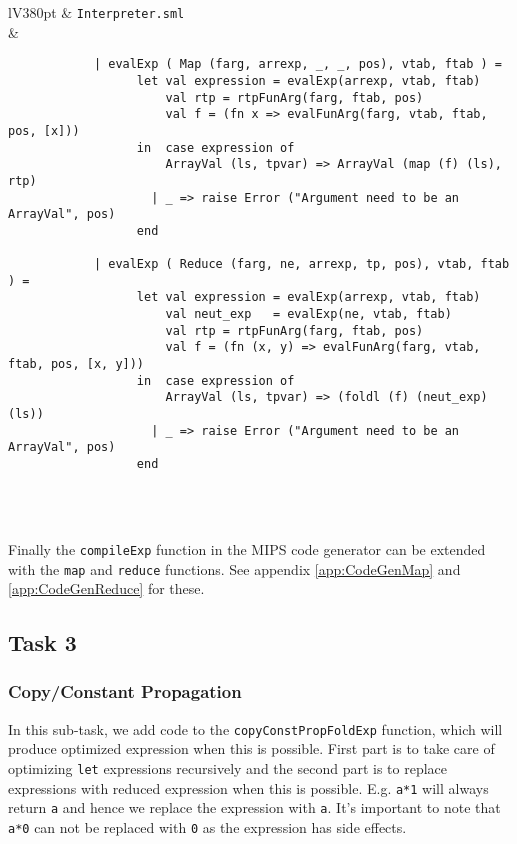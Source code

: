 \documentclass[a4paper]{article}
\begin{document}
\begin{center}	
	\begin{tabular}{lV{380pt}}
		\toprule
		& \verb|Interpreter.sml|\\
		\midrule
		&
		\begin{verbatim}		
			| evalExp ( Map (farg, arrexp, _, _, pos), vtab, ftab ) =
			      let val expression = evalExp(arrexp, vtab, ftab)
			          val rtp = rtpFunArg(farg, ftab, pos)
			          val f = (fn x => evalFunArg(farg, vtab, ftab, pos, [x]))
			      in  case expression of
			          ArrayVal (ls, tpvar) => ArrayVal (map (f) (ls), rtp)
			        | _ => raise Error ("Argument need to be an ArrayVal", pos)
			      end
			
			| evalExp ( Reduce (farg, ne, arrexp, tp, pos), vtab, ftab ) =
			      let val expression = evalExp(arrexp, vtab, ftab)
			          val neut_exp   = evalExp(ne, vtab, ftab)
			          val rtp = rtpFunArg(farg, ftab, pos)
			          val f = (fn (x, y) => evalFunArg(farg, vtab, ftab, pos, [x, y]))
			      in  case expression of
			          ArrayVal (ls, tpvar) => (foldl (f) (neut_exp) (ls))
			        | _ => raise Error ("Argument need to be an ArrayVal", pos)
			      end
		\end{verbatim}
		\\
		\bottomrule \\
	\end{tabular}
\end{center}
	
Finally the \verb|compileExp| function in the MIPS code generator can be extended with the \verb|map| and \verb|reduce| functions. See appendix \ref{app:CodeGenMap} and \ref{app:CodeGenReduce} for these.

\subsection{Task 3}

\subsubsection{Copy/Constant Propagation}

In this sub-task, we add code to the \texttt{copyConstPropFoldExp} function, which will produce optimized expression when this is possible. First part is to take care of optimizing \texttt{let} expressions recursively and the second part is to replace expressions with reduced expression when this is possible.
E.g. \texttt{a*1} will always return \texttt{a} and hence we replace the expression with \texttt{a}. It's important to note that \texttt{a*0} can not be replaced with \texttt{0} as the expression has side effects.
\end{document}
